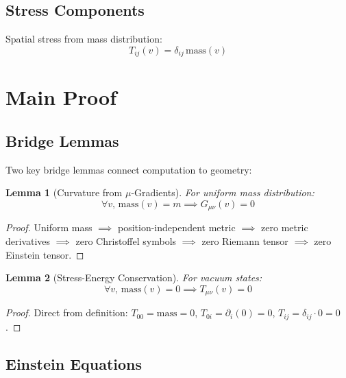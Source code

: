 \documentclass[11pt,twocolumn]{article}
\newtheorem{lemma}{Lemma}
\begin{document}
\subsection{Stress Components}

Spatial stress from mass distribution:
\begin{equation}
T_{ij}(v) = \delta_{ij} \, \text{mass}(v)
\end{equation}

\section{Main Proof}

\subsection{Bridge Lemmas}

Two key bridge lemmas connect computation to geometry:

\begin{lemma}[Curvature from $\mu$-Gradients]
\label{lem:curvature}
For uniform mass distribution:
\begin{equation}
\forall v, \, \text{mass}(v) = m \implies G_{\mu\nu}(v) = 0
\end{equation}
\end{lemma}

\begin{proof}
Uniform mass $\implies$ position-independent metric $\implies$ zero metric derivatives $\implies$ zero Christoffel symbols $\implies$ zero Riemann tensor $\implies$ zero Einstein tensor.
\end{proof}

\begin{lemma}[Stress-Energy Conservation]
\label{lem:conservation}
For vacuum states:
\begin{equation}
\forall v, \, \text{mass}(v) = 0 \implies T_{\mu\nu}(v) = 0
\end{equation}
\end{lemma}

\begin{proof}
Direct from definition: $T_{00} = \text{mass} = 0$, $T_{0i} = \partial_i(0) = 0$, $T_{ij} = \delta_{ij} \cdot 0 = 0$.
\end{proof}

\subsection{Einstein Equations}
\end{document}

